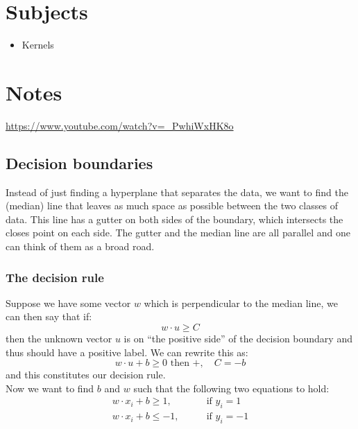 


    \section{Subjects}
    \begin{itemize}
        \item Kernels
    \end{itemize}
    \section{Notes}
    
    \url{https://www.youtube.com/watch?v=_PwhiWxHK8o}
    
    \subsection{Decision boundaries}
    Instead of just finding a hyperplane that separates the data, we want to 
    find the (median) line that leaves as much space as possible between the 
    two classes of data. This line has a gutter on both sides of the boundary, 
    which intersects the closes point on each side. The gutter and the median 
    line are all parallel and one can think of them as a broad road.
    
    \subsubsection{The decision rule}
    Suppose we have some vector $w$ which is perpendicular to the median line, 
    we can then say that if:
    \begin{equation*}
        w \cdot u \geq C
    \end{equation*}
    then the unknown vector $u$ is on ``the positive side'' of the decision 
    boundary and thus should have a positive label. We can rewrite this as:
    \begin{equation*}
        w \cdot u + b \geq 0 \text{ then +}, \quad C = -b
    \end{equation*}
    and this constitutes our decision rule.\\
    Now we want to find $b$ and $w$ such that the following two equations to 
    hold:
    \begin{align*}
        w \cdot x_i + b \geq 1, \qquad &\text{if } y_i = 1\\
        w \cdot x_i + b \leq -1, \qquad &\text{if } y_i = -1
    \end{align*}
    
